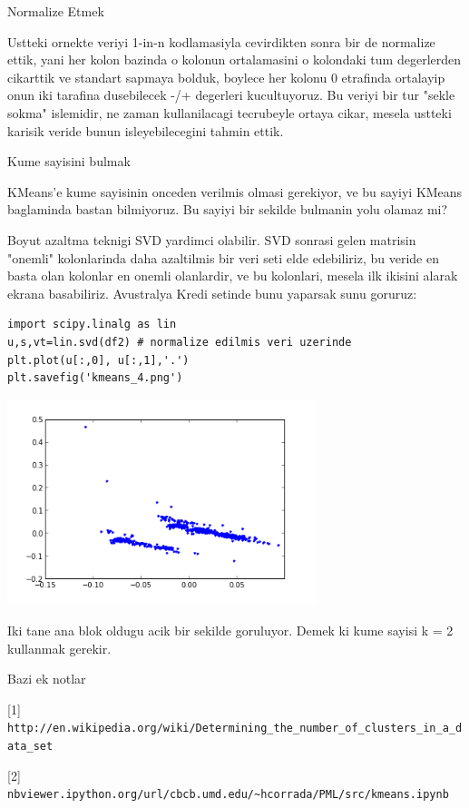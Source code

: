 \documentclass[12pt,fleqn]{article}\usepackage{../common}
\begin{document}
Normalize Etmek

Ustteki ornekte veriyi 1-in-n kodlamasiyla cevirdikten sonra bir de
normalize ettik, yani her kolon bazinda o kolonun ortalamasini o
kolondaki tum degerlerden cikarttik ve standart sapmaya bolduk,
boylece her kolonu 0 etrafinda ortalayip onun iki tarafina dusebilecek
-/+ degerleri kucultuyoruz. Bu veriyi bir tur "sekle sokma" islemidir,
ne zaman kullanilacagi tecrubeyle ortaya cikar, mesela ustteki karisik
veride bunun isleyebilecegini tahmin ettik. 

Kume sayisini bulmak

KMeans'e kume sayisinin onceden verilmis olmasi gerekiyor, ve bu
sayiyi KMeans baglaminda bastan bilmiyoruz. Bu sayiyi bir sekilde
bulmanin yolu olamaz mi?

Boyut azaltma teknigi SVD yardimci olabilir. SVD sonrasi gelen
matrisin "onemli" kolonlarinda daha azaltilmis bir veri seti elde
edebiliriz, bu veride en basta olan kolonlar en onemli olanlardir, ve
bu kolonlari, mesela ilk ikisini alarak ekrana basabiliriz. Avustralya
Kredi setinde bunu yaparsak sunu goruruz:

\begin{verbatim}
import scipy.linalg as lin
u,s,vt=lin.svd(df2) # normalize edilmis veri uzerinde
plt.plot(u[:,0], u[:,1],'.')
plt.savefig('kmeans_4.png')
\end{verbatim}

\includegraphics[height=6cm]{kmeans_4.png}

Iki tane ana blok oldugu acik bir sekilde goruluyor. Demek ki kume sayisi
k = 2 kullanmak gerekir. 

Bazi ek notlar

[1] \verb!http://en.wikipedia.org/wiki/Determining_the_number_of_clusters_in_a_data_set!

[2] \verb!nbviewer.ipython.org/url/cbcb.umd.edu/~hcorrada/PML/src/kmeans.ipynb!
\end{document}
